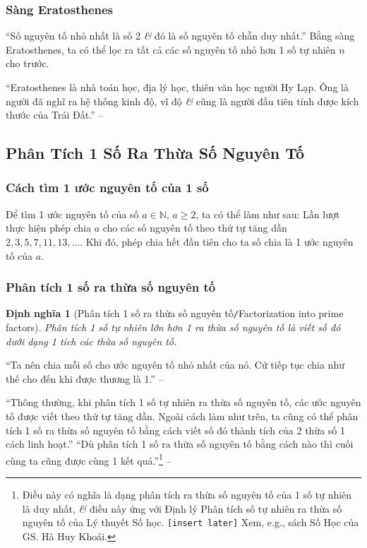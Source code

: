 \documentclass{article}
\numberwithin{equation}{section}
\newtheorem{dinhnghia}{Định nghĩa}[section]
\begin{document}
\subsubsection{Sàng Eratosthenes}
``Số nguyên tố nhỏ nhất là số 2 \textit{\&} đó là số nguyên tố chẵn duy nhất.'' Bằng sàng Eratosthenes, ta có thể lọc ra tất cả các số nguyên tố nhỏ hơn 1 số tự nhiên $n$ cho trước.

``Eratosthenes là nhà toán học, địa lý học, thiên văn học người Hy Lạp. Ông là người đã nghĩ ra hệ thống kinh độ, vĩ độ \textit{\&} cũng là người đầu tiên tính được kích thước của Trái Đất.'' -- \cite[p. 43]{SGK_Toan_6_Canh_Dieu_tap_1}


\subsection{Phân Tích 1 Số Ra Thừa Số Nguyên Tố}

\subsubsection{Cách tìm 1 ước nguyên tố của 1 số}
\begin{tcolorbox}
	Để tìm 1 ước nguyên tố của số $a\in\mathbb{N}$, $a\ge 2$, ta có thể làm như sau: Lần lượt thực hiện phép chia $a$ cho các số nguyên tố theo thứ tự tăng dần $2,3,5,7,11,13,\ldots$. Khi đó, phép chia hết đầu tiên cho ta số chia là 1 ước nguyên tố của $a$.
\end{tcolorbox}

\subsubsection{Phân tích 1 số ra thừa số nguyên tố}

\begin{dinhnghia}[Phân tích 1 số ra thừa số nguyên tố\texttt{/}Factorization into prime factors]
	\emph{Phân tích 1 số tự nhiên lớn hơn 1 ra thừa số nguyên tố} là viết số đó dưới dạng 1 tích các thừa số nguyên tố.
\end{dinhnghia}
``Ta nên chia mỗi số cho ước nguyên tố nhỏ nhất của nó. Cứ tiếp tục chia như thế cho đến khi được thương là 1.'' -- \cite[p. 45]{SGK_Toan_6_Canh_Dieu_tap_1}

``Thông thường, khi phân tích 1 số tự nhiên ra thừa số nguyên tố, các ước nguyên tố được viết theo thứ tự tăng dần. Ngoài cách làm như trên, ta cũng có thể phân tích 1 số ra thừa số nguyên tố bằng cách viết số đó thành tích của 2 thừa số 1 cách linh hoạt.'' ``Dù phân tích 1 số ra thừa số nguyên tố bằng cách nào thì cuối cùng ta cũng được cùng 1 kết quả.''\footnote{Điều này có nghĩa là dạng phân tích ra thừa số nguyên tố của 1 số tự nhiên là duy nhất, \textit{\&} điều này ứng với Định lý Phân tích số tự nhiên ra thừa số nguyên tố của Lý thuyết Số học. \texttt{[insert later]} Xem, e.g., sách Số Học của GS. Hà Huy Khoái.} -- \cite[p. 46]{SGK_Toan_6_Canh_Dieu_tap_1}
\end{document}
